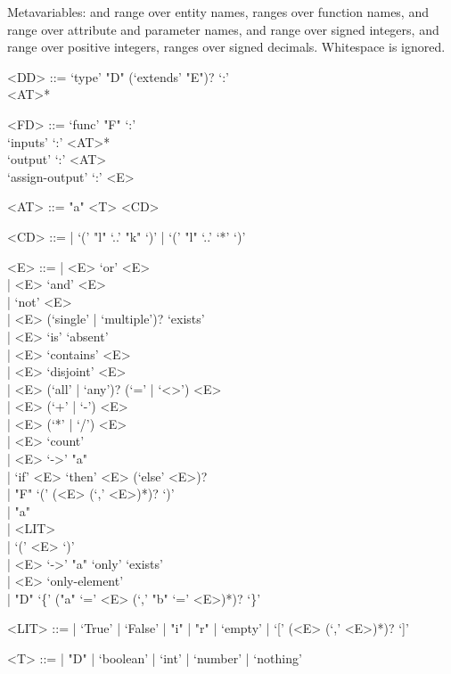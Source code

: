 Metavariables:  and  range over entity names,  ranges over function names,  and  range over attribute and parameter names,  and  range over signed integers,  and  range over positive integers,  ranges over signed decimals. Whitespace is ignored.

\begin{defbox}[2]
\begin{grammar}
<DD> ::= 
  `type' "D" (`extends' "E")? `:'\\
\ind <AT>*

<FD> ::= 
  `func' "F" `:'\\
\ind `inputs' `:' <AT>*\\
\ind `output' `:' <AT>\\
\ind `assign-output' `:' <E>

<AT> ::= 
  "a" <T> <CD>

<CD> ::= 
  | `(' "l" `..' "k" `)' 
  | `(' "l" `..' `*' `)' 

<E> ::= 
  | <E> `or' <E>\\
  | <E> `and' <E>\\
  | `not' <E>\\
  | <E> (`single' | `multiple')? `exists'\\
  | <E> `is' `absent'\\
  | <E> `contains' <E>\\
  | <E> `disjoint' <E>\\
  | <E> (`all' | `any')? (`=' | `<>') <E>\\
  | <E> (`+' | `-') <E>\\
  | <E> (`*' | `/') <E>\\
  | <E> `count'\\
  | <E> `->' "a"\\
  | `if' <E> `then' <E> (`else' <E>)?\\
  | "F" `(' (<E> (`,' <E>)*)? `)'\\
  | "a"\\
  | <LIT>\\
  | `(' <E> `)'\\
  | <E> `->' "a" `only' `exists'\\
  | <E> `only-element'\\
  | "D" `\{' ("a" `=' <E> (`,' "b" `=' <E>)*)? `\}'

<LIT> ::= 
  | `True' | `False' 
  | "i" 
  | "r" 
  | `empty' 
  | `[' (<E> (`,' <E>)*)? `]' 

<T> ::= 
  | "D"
  | `boolean'
  | `int'
  | `number'
  | `nothing'
\end{grammar}
\end{defbox}

